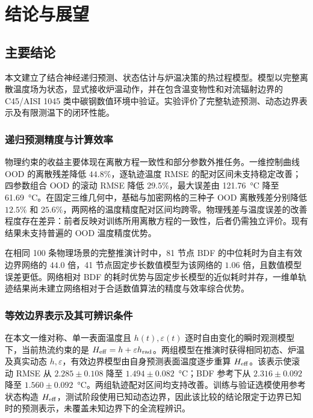 \chapter{结论与展望}

\section{主要结论}

本文建立了结合神经递归预测、状态估计与炉温决策的热过程模型。模型以完整离散温度场为状态，显式接收炉温动作，并在包含温变物性和对流辐射边界的 C45/AISI 1045 类中碳钢数值环境中验证。实验评价了完整轨迹预测、动态边界表示及有限测温下的闭环性能。

\subsection{递归预测精度与计算效率}

物理约束的收益主要体现在离散方程一致性和部分参数外推任务。一维控制曲线 OOD 的离散残差降低 $44.8\%$，逐轨迹温度 RMSE 的配对区间未支持稳定改善；四参数组合 OOD 的滚动 RMSE 降低 $29.5\%$，最大误差由 \SI{121.76}{\degreeCelsius} 降至 \SI{61.69}{\degreeCelsius}。在固定三维几何中，基础与加密网格的三种子 OOD 离散残差分别降低 $12.5\%$ 和 $25.6\%$，两网格的温度精度配对区间均跨零。物理残差与温度误差的改善程度存在差异：前者反映对训练所用离散方程的一致性，后者仍需独立评价。现有结果未支持普遍的 OOD 温度精度优势。

在相同 100 条物理场景的完整推演计时中，81 节点 BDF 的中位耗时为自主有效边界网络的 $44.0$ 倍，41 节点固定步长数值模型为该网络的 $1.06$ 倍，且数值模型误差更低。网络相对 BDF 的耗时优势与固定步长模型的近似耗时并存，一维单轨迹结果尚未建立网络相对于合适数值算法的精度与效率综合优势。

\subsection{等效边界表示及其可辨识条件}

在本文一维对称、单一表面温度且 $h(t),\varepsilon(t)$ 逐时自由变化的瞬时观测模型下，当前热流约束的是 ${H_{\mathrm{eff}}}=h+\varepsilon h_{\mathrm{rad}}$。两组模型在推演时获得相同初态、炉温及真实动态 $h,\varepsilon$，有效边界模型由自身预测表面温度逐步重算 ${H_{\mathrm{eff}}}$。该表示使滚动 RMSE 从 $2.285\pm0.108$ 降至 $1.494\pm0.082$~\si{\degreeCelsius}；BDF 参考下从 $2.316\pm0.092$ 降至 $1.560\pm0.092$~\si{\degreeCelsius}。两组轨迹配对区间均支持改善。训练与验证选模使用参考状态构造 ${H_{\mathrm{eff}}}$，测试阶段使用已知动态边界，因此该比较的结论限定于边界已知时的预测表示，未覆盖未知边界下的全流程辨识。

